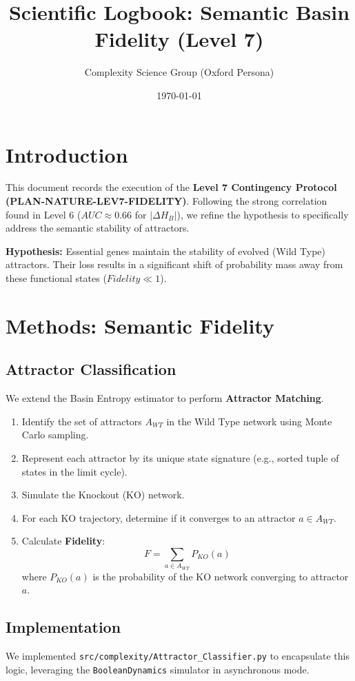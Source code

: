 \documentclass{article}
\title{Scientific Logbook: Semantic Basin Fidelity (Level 7)}
\author{Complexity Science Group (Oxford Persona)}
\date{\today}
\begin{document}
\maketitle

\tableofcontents

\section{Introduction}
This document records the execution of the \textbf{Level 7 Contingency Protocol (PLAN-NATURE-LEV7-FIDELITY)}. Following the strong correlation found in Level 6 ($AUC \approx 0.66$ for $|\Delta H_B|$), we refine the hypothesis to specifically address the semantic stability of attractors.

\textbf{Hypothesis:} Essential genes maintain the stability of evolved (Wild Type) attractors. Their loss results in a significant shift of probability mass away from these functional states ($Fidelity \ll 1$).

\section{Methods: Semantic Fidelity}

\subsection{Attractor Classification}
We extend the Basin Entropy estimator to perform \textbf{Attractor Matching}.
\begin{enumerate}
    \item Identify the set of attractors $A_{WT}$ in the Wild Type network using Monte Carlo sampling.
    \item Represent each attractor by its unique state signature (e.g., sorted tuple of states in the limit cycle).
    \item Simulate the Knockout (KO) network.
    \item For each KO trajectory, determine if it converges to an attractor $a \in A_{WT}$.
    \item Calculate \textbf{Fidelity}:
    \[ F = \sum_{a \in A_{WT}} P_{KO}(a) \]
    where $P_{KO}(a)$ is the probability of the KO network converging to attractor $a$.
\end{enumerate}

\subsection{Implementation}
We implemented \texttt{src/complexity/Attractor\_Classifier.py} to encapsulate this logic, leveraging the \texttt{BooleanDynamics} simulator in asynchronous mode.
\end{document}
